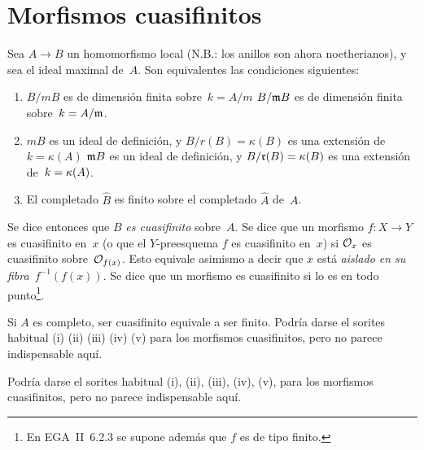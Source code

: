 \section{Morfismos cuasifinitos}
\label{I.2}
\begin{proposition}
\label{I.2.1}
Sea $A\to B$ un homomorfismo local (N.B.: los anillos son ahora noetherianos), y sea  el ideal maximal de~$A$. Son equivalentes las condiciones siguientes:
\begin{enumerate}
\item[(i)] 
{$B/mB$ es de dimensión finita sobre~$k=A/m$}
{$B/\goth{m}B$ es de dimensión finita sobre~$k=A/\goth{m}$}.
\item[(ii)] 
{$mB$ es un ideal de definición, y $B/r(B)=\kappa(B)$ es una extensión de~$k=\kappa(A)$}
{$\goth{m}B$ es un ideal de definición, y $B/\goth{r}(B)=\kres(B)$ es una extensión de~$k=\kres(A)$}.
\item[(iii)] El completado $\widehat{B}$ es finito sobre el completado $\widehat{A}$ de~$A$.
\end{enumerate}
\end{proposition}
Se dice entonces
que $B$ \emph{es cuasifinito}
%
sobre~$A$. Se dice que un morfismo $f\colon X\to Y$ es cuasifinito en~$x$ (o que el $Y$-preesquema $f$ es cuasifinito en~$x$) si $\cal{O}_x$ es cuasifinito sobre~$\cal{O}_{f(x)}$. Esto equivale asimismo a decir que $x$ está \emph{aislado en su fibra}~$f^{-1}(f(x))$.%
Se dice que un morfismo es cuasifinito si lo es en todo punto\footnote{En EGA~II~6.2.3 se supone además que $f$ es de tipo finito.}.
\begin{corollaire}
\label{I.2.2}
Si $A$ es completo, ser cuasifinito equivale a ser finito.
{Podría darse el sorites habitual \textup{(i) (ii) (iii) (iv) (v)} para los morfismos cuasifinitos, pero no parece indispensable aquí.}
{}
\end{corollaire}

{}
{Podría darse el sorites habitual \textup{(i), (ii), (iii), (iv), (v),} para los morfismos cuasifinitos, pero no parece indispensable aquí.}

